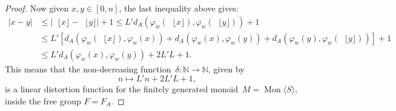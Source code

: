 \documentclass[10pt,a4paper]{amsart}
\newcommand{\Mgen}[1]{\operatorname{Mon}\bigl\langle #1 \bigr\rangle}
\newcommand{\N}{\mathbb{N}}
\newcommand{\floor}[1]{\operatorname{}\lfloor #1 \rfloor}
\begin{document}
\begin{proof}
Now given $x, y \in [0, n]$, the last inequality above gives:
\begin{align*}
|x - y| & \leq |\floor x - \floor y| + 1 \leq L' d_A(\varphi_w(\floor x ), \varphi_w(\floor y )) + 1\\
& \leq L' \left[
d_A(\varphi_w(\floor x ), \varphi_w(x)) +
d_A(\varphi_w(x), \varphi_w(y)) + 
d_A(\varphi_w(y), \varphi_w(\floor y ))
\right] + 1 \\
& \leq L'd_A(\varphi_w(x), \varphi_w(y)) + 2L'L + 1.
\end{align*}
This means that the non-decreasing function~$\delta \colon \N \rightarrow \N$, given by 
\[
n \mapsto L'n + 2L'L + 1,
\]
is a linear distortion function for the finitely generated monoid~$M = \Mgen{S}$, inside the free group $F = F_A$.
\end{proof}
\end{document}
